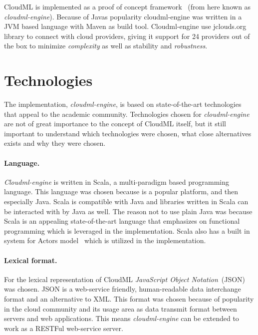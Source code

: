 
CloudML is implemented as a proof of concept framework~\cite{cloudml-engine}
(from here known as \emph{cloudml-engine}). 
Because of Javas popularity cloudml-engine was written in a JVM based language with Maven as build tool.
Cloudml-engine use jclouds.org library to connect with cloud providers, giving it support
for 24 providers out of the box to minimize \emph{complexity} as well as stability and \emph{robustness}.

\section{Technologies}

The implementation, \emph{cloudml-engine}, 
is based on state-of-the-art technologies that appeal to the academic community.
Technologies chosen for \emph{cloudml-engine} are not of great importance to the concept of CloudML itself,
but it still important to understand which technologies were chosen, what close alternatives exists
and why they were chosen.

\paragraph{Language.} 
\emph{Cloudml-engine} is written in Scala, a multi-paradigm  based programming language.
This language was chosen because  is a popular platform, and then especially Java.
Scala is compatible with Java and libraries written in Scala can be interacted with by Java as well.
The reason not to use plain Java was because Scala is an appealing state-of-the-art language that emphasizes 
on functional programming which is leveraged in the implementation.
Scala also has a built in system for Actors model~\cite{actors:haller07} which is utilized in the implementation.

\paragraph{Lexical format.}
For the lexical representation of CloudML \emph{JavaScript Object Notation}~(JSON) was chosen.
JSON is a web-service friendly, human-readable data interchange format and an alternative to XML.
This format was chosen because of popularity in the cloud community 
and its usage area as data transmit format between servers and web applications.
This means \emph{cloudml-engine} can be extended to work as a RESTFul web-service server.

